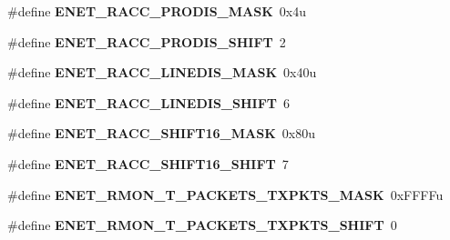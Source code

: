 \begin{DoxyCompactItemize}
\item 
\hypertarget{group___e_n_e_t___register___masks_ga853ee7c551a69a87b8bb9feb9e6bcd42}{}\#define {\bfseries E\+N\+E\+T\+\_\+\+R\+A\+C\+C\+\_\+\+P\+R\+O\+D\+I\+S\+\_\+\+M\+A\+S\+K}~0x4u\label{group___e_n_e_t___register___masks_ga853ee7c551a69a87b8bb9feb9e6bcd42}

\item 
\hypertarget{group___e_n_e_t___register___masks_ga5fc6d1cec21b565a6c3a6fba5b9b61a4}{}\#define {\bfseries E\+N\+E\+T\+\_\+\+R\+A\+C\+C\+\_\+\+P\+R\+O\+D\+I\+S\+\_\+\+S\+H\+I\+F\+T}~2\label{group___e_n_e_t___register___masks_ga5fc6d1cec21b565a6c3a6fba5b9b61a4}

\item 
\hypertarget{group___e_n_e_t___register___masks_ga591e216898eadc84023405031bd74543}{}\#define {\bfseries E\+N\+E\+T\+\_\+\+R\+A\+C\+C\+\_\+\+L\+I\+N\+E\+D\+I\+S\+\_\+\+M\+A\+S\+K}~0x40u\label{group___e_n_e_t___register___masks_ga591e216898eadc84023405031bd74543}

\item 
\hypertarget{group___e_n_e_t___register___masks_ga64a03ab6a1228c5c8f9cad7d7b9444da}{}\#define {\bfseries E\+N\+E\+T\+\_\+\+R\+A\+C\+C\+\_\+\+L\+I\+N\+E\+D\+I\+S\+\_\+\+S\+H\+I\+F\+T}~6\label{group___e_n_e_t___register___masks_ga64a03ab6a1228c5c8f9cad7d7b9444da}

\item 
\hypertarget{group___e_n_e_t___register___masks_gac74a3eea05cf48034e6891edbbf92428}{}\#define {\bfseries E\+N\+E\+T\+\_\+\+R\+A\+C\+C\+\_\+\+S\+H\+I\+F\+T16\+\_\+\+M\+A\+S\+K}~0x80u\label{group___e_n_e_t___register___masks_gac74a3eea05cf48034e6891edbbf92428}

\item 
\hypertarget{group___e_n_e_t___register___masks_gaa96c07fba3d15bc1cdd32bd4f7b94998}{}\#define {\bfseries E\+N\+E\+T\+\_\+\+R\+A\+C\+C\+\_\+\+S\+H\+I\+F\+T16\+\_\+\+S\+H\+I\+F\+T}~7\label{group___e_n_e_t___register___masks_gaa96c07fba3d15bc1cdd32bd4f7b94998}

\item 
\hypertarget{group___e_n_e_t___register___masks_gaae18bf5610b11cd5c5418e426bfc9faf}{}\#define {\bfseries E\+N\+E\+T\+\_\+\+R\+M\+O\+N\+\_\+\+T\+\_\+\+P\+A\+C\+K\+E\+T\+S\+\_\+\+T\+X\+P\+K\+T\+S\+\_\+\+M\+A\+S\+K}~0x\+F\+F\+F\+Fu\label{group___e_n_e_t___register___masks_gaae18bf5610b11cd5c5418e426bfc9faf}

\item 
\hypertarget{group___e_n_e_t___register___masks_gaedbb5b49e8c1f579fb37ff45c77739b1}{}\#define {\bfseries E\+N\+E\+T\+\_\+\+R\+M\+O\+N\+\_\+\+T\+\_\+\+P\+A\+C\+K\+E\+T\+S\+\_\+\+T\+X\+P\+K\+T\+S\+\_\+\+S\+H\+I\+F\+T}~0\label{group___e_n_e_t___register___masks_gaedbb5b49e8c1f579fb37ff45c77739b1}


\end{DoxyCompactItemize}
